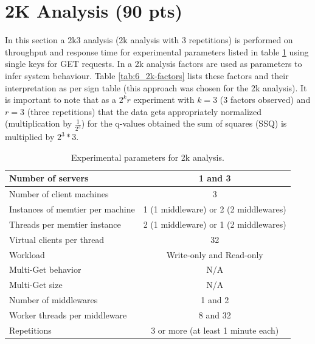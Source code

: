\section{2K Analysis (90 pts)\label{sec:6}}

    In this section a 2k3 analysis (2k analysis with 3 repetitions) is performed on throughput and response time for
    experimental parameters listed in table \ref{tab:6_setup} using single keys for GET requests. In a 2k analysis
    factors are used as parameters to infer system behaviour. Table \ref{tab:6_2k-factors} lists these factors and their
    interpretation as per sign table (this approach was chosen for the 2k analysis). It is important to note that as a
    $2^k r$ experiment with $k = 3$ (3 factors observed) and $r = 3$ (three repetitions) that the data gets
    appropriately normalized (multiplication by $\tfrac{1}{2^3}$) for the q-values obtained the sum of squares (SSQ) is
    multiplied by $2^3 * 3$.

    \begin{table}
        \scriptsize{
            \begin{tabular}{|l|c|}
                \hline Number of servers                & 1 and 3 \\
                \hline Number of client machines        & 3 \\
                \hline Instances of memtier per machine & 1 (1 middleware) or 2 (2 middlewares) \\
                \hline Threads per memtier instance     & 2 (1 middleware) or 1 (2 middlewares) \\
                \hline Virtual clients per thread       & 32 \\
                \hline Workload                         & Write-only and Read-only \\
                \hline Multi-Get behavior               & N/A \\
                \hline Multi-Get size                   & N/A \\
                \hline Number of middlewares            & 1 and 2 \\
                \hline Worker threads per middleware    & 8 and 32 \\
                \hline Repetitions                      & 3 or more (at least 1 minute each) \\
                \hline
            \end{tabular}
        \caption{Experimental parameters for 2k analysis.\label{tab:6_setup}}
        }
    \end{table}

